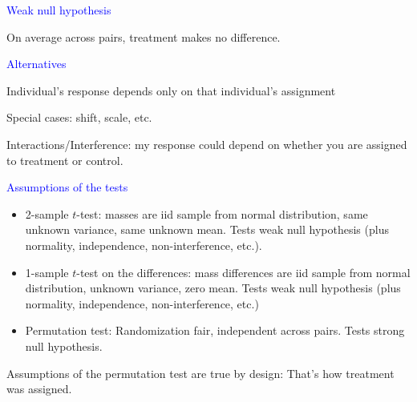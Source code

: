 \documentclass[landscape]{slides}
\begin{document}
\begin {slide}


{\textcolor{blue}{\sc Weak null hypothesis}}

{\textcolor{one}{On average across pairs, treatment makes no difference.}}


\end {slide}

\begin {slide}


{\textcolor{blue}{\sc Alternatives}}

{\textcolor{one}{Individual's response depends only on that individual's assignment}}

Special cases: shift, scale, etc.

{\textcolor{one}{Interactions/Interference: my response could depend on whether you are assigned to treatment or control.}}



\end {slide}

\begin {slide}
{\textcolor{blue}{\sc Assumptions of the tests}}

\begin{itemize}
	\item 2-sample $t$-test: 
	      {\textcolor{one}{masses are iid sample from normal distribution,
	      same unknown variance, same unknown mean.}}  
	      Tests weak null hypothesis (plus normality, independence, non-interference, etc.).
	\item 1-sample $t$-test on the differences: 
	      {\textcolor{one}{mass differences are iid sample from normal 
	      distribution, unknown variance, zero mean.}}
	      Tests weak null hypothesis (plus normality, independence, non-interference, etc.)
	\item Permutation test: 
	      {\textcolor{one}{Randomization fair, independent across pairs.}}
	      Tests strong null hypothesis.
\end{itemize}
Assumptions of the permutation test are true by design: That's how treatment
was assigned.

\end {slide}
\end{document}

